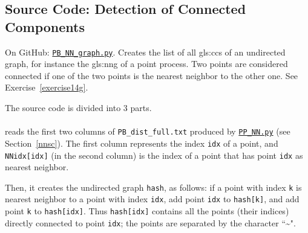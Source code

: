 \documentclass[10pt]{article}
\begin{document}
\subsection{Source Code: Detection of Connected Components}\label{scc}

{On GitHub}: \href{https://github.com/VincentGranville/Point-Processes/blob/main/Source\%20Code/PB_NN_graph.py}{\texttt{PB\_NN\_graph.py}}. Creates the list of all
\glspl{gls:cc} of an
\textcolor{index}{undirected graph},
for instance the  \gls{gls:nng} of a point process. Two points are considered connected if one of the two points is the nearest neighbor to the other one.
See Exercise~\ref{exercise14g}.

\noindent The source code is divided into 3 parts. \\
\quad \\
 reads the first two columns of \texttt{PB\_dist\_full.txt} produced by
\href{https://github.com/VincentGranville/Point-Processes/blob/main/Source\%20Code/PB_NN.py}{\texttt{PP\_NN.py}} (see Section~\ref{nnsc}). The first column represents the index
\texttt{idx} of a point, and \texttt{NNidx[idx]} (in the second column) is the index of a point that has point \texttt{idx} as nearest neighbor.

\noindent Then, it creates the undirected graph \texttt{hash}, as follows:  if a point with index \texttt{k} is nearest neighbor to a point with index
\texttt{idx}, add point \texttt{idx} to
\texttt{hash[k]}, and add point \texttt{k} to \texttt{hash[idx]}.
Thus \texttt{hash[idx]} contains all the points (their indices) directly connected to point \texttt{idx}; the points are separated
by the character ``\textasciitilde".
\end{document}
